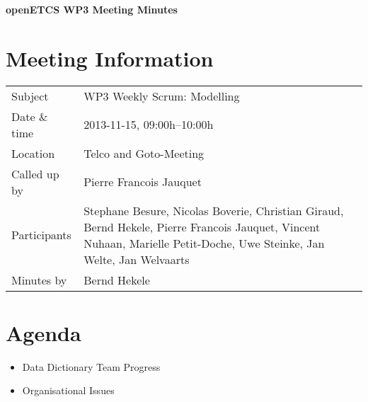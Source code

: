 \documentclass[a4paper, 11pt]{article}
\begin{document}
{\begin{center}\huge\bf openETCS WP3 Meeting Minutes\end{center}}
\section{Meeting Information}

\renewcommand{\arraystretch}{1.5}
\begin{supertabular}{m{.2\textwidth}m{.8\textwidth}}
Subject & WP3 Weekly Scrum: Modelling\\
Date \& time & 2013-11-15, 09:00h--10:00h\\
Location & Telco and Goto-Meeting\\
Called up by & Pierre Francois Jauquet\\
Participants &
Stephane Besure,
Nicolas Boverie,
Christian Giraud,
Bernd Hekele,
Pierre Francois Jauquet,
Vincent Nuhaan,
Marielle Petit-Doche,
Uwe Steinke,
Jan Welte,
Jan Welvaarts
\\

Minutes by & Bernd Hekele\\
\end{supertabular}
\renewcommand{\arraystretch}{1.0}


\section{{Agenda}}
\begin{itemize}
\item Data Dictionary Team Progress
\item Organisational Issues 
\end{itemize}
\end{document}
